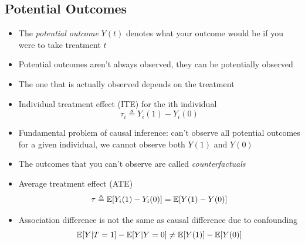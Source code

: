 \documentclass[../main.tex]{subfiles}
\begin{document}
  \subsection{Potential Outcomes}
    \begin{itemize}
      \item The \textit{potential outcome} $Y(t)$ denotes what your outcome would be if you were to take treatment $t$
      \item Potential outcomes aren't always observed, they can be potentially observed
      \item The one that is actually observed depends on the treatment
      \item Individual treatment effect (ITE) for the ith individual
      \begin{equation*}
        \tau_{i} \triangleq Y_{i}(1) - Y_{i}(0)
      \end{equation*}
      \item Fundamental problem of causal inference: can't observe all potential outcomes for a given individual, we cannot observe both $Y(1)$ and $Y(0)$
      \item The outcomes that you can't observe are called \textit{counterfactuals}
      \item Average treatment effect (ATE)
      \begin{equation*}
        \tau \triangleq \mathbb{E}[Y_{i}(1) - Y_{i}(0)] = \mathbb{E}[Y(1) - Y(0)]
      \end{equation*}
      \item Association difference is not the same as causal difference due to confounding
      \begin{equation*}
        \mathbb{E}[Y|T=1] - \mathbb{E}[Y|Y=0] \neq \mathbb{E}[Y(1)] - \mathbb{E}[Y(0)]
      \end{equation*}
    \end{itemize}
\end{document}
